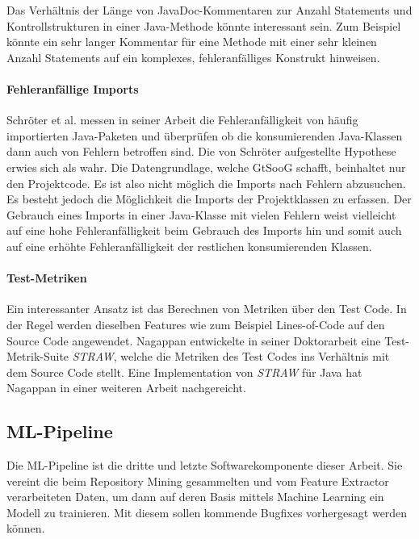 \documentclass[10pt, a4paper]{article}
\begin{document}
Das Verhältnis der Länge von JavaDoc-Kommentaren zur Anzahl Statements und Kontrollstrukturen in einer Java-Methode könnte interessant sein. Zum Beispiel könnte ein sehr langer Kommentar für eine Methode mit einer sehr kleinen Anzahl Statements auf ein komplexes, fehleranfälliges Konstrukt hinweisen.

\paragraph{Fehleranfällige Imports}

Schröter et al. \cite{Schroter:2006:PCF:1159733.1159739} messen in seiner Arbeit die Fehleranfälligkeit von häufig importierten Java-Paketen und überprüfen ob die konsumierenden Java-Klassen dann auch von Fehlern betroffen sind. Die von Schröter aufgestellte Hypothese erwies sich als wahr. Die Datengrundlage, welche GtSooG schafft, beinhaltet nur den Projektcode. Es ist also nicht möglich die Imports nach Fehlern abzusuchen. Es besteht jedoch die Möglichkeit die Imports der Projektklassen zu erfassen. Der Gebrauch eines Imports in einer Java-Klasse mit vielen Fehlern weist vielleicht auf eine hohe Fehleranfälligkeit beim Gebrauch des Imports hin und somit auch auf eine erhöhte Fehleranfälligkeit der restlichen konsumierenden Klassen.

\paragraph{Test-Metriken}

Ein interessanter Ansatz ist das Berechnen von Metriken über den Test Code. In der Regel werden dieselben Features wie zum Beispiel Lines-of-Code auf den Source Code angewendet. Nagappan \cite{Nagappan:2005:PHD} entwickelte in seiner Doktorarbeit eine Test-Metrik-Suite \emph{STRAW}, welche die Metriken des Test Codes ins Verhältnis mit dem Source Code stellt. Eine Implementation von \emph{STRAW} für Java hat Nagappan \cite{Nagappan:2007:4402212} in einer weiteren Arbeit nachgereicht. 

\subsection{ML-Pipeline} \label{sec:mlpipeline}

Die ML-Pipeline ist die dritte und letzte Softwarekomponente dieser Arbeit. Sie vereint die beim Repository Mining gesammelten und vom Feature Extractor verarbeiteten Daten, um dann auf deren Basis mittels Machine Learning ein Modell zu trainieren. Mit diesem sollen kommende Bugfixes vorhergesagt werden können.
\end{document}
